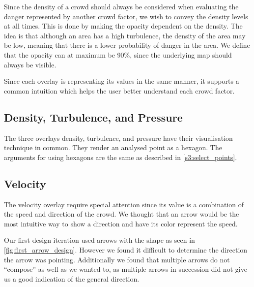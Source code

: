Since the density of a crowd should always be considered when evaluating the danger represented by another crowd factor, we wish to convey the density levels at all times. This is done by making the opacity dependent on the density. The idea is that although an area has a high turbulence, the density of the area may be low, meaning that there is a lower probability of danger in the area. We define that the opacity can at maximum be 90\%, since the underlying map should always be visible.


Since each overlay is representing its values in the same manner, it supports a common intuition which helps the user better understand each crowd factor.

\subsection{Density, Turbulence, and Pressure}
The three overlays density, turbulence, and pressure have their visualisation technique in common. They render an analysed point as a hexagon. The arguments for using hexagons are the same as described in \cref{s3:select_points}.


\subsection{Velocity}
The velocity overlay require special attention since its value is a combination of the speed and direction of the crowd. We thought that an arrow would be the most intuitive way to show a direction and have its color represent the speed.


Our first design iteration used arrows with the shape as seen in \cref{fig:first_arrow_design}. However we found it difficult to determine the direction the arrow was pointing. Additionally we found that multiple arrows do not \enquote{compose} as well as we wanted to, as multiple arrows in succession did not give us a good indication of the general direction.



